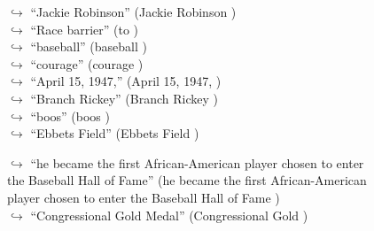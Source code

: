 \documentclass[11pt,a4paper, onecolumn]{article}
\begin{document}
\begin{figure}[t] \small \begin{tcolorbox}[boxsep=0pt,left=5pt,right=0pt,top=2pt,colback = yellow!5] \begin{dialogue}
 \small 
\colorbox{pink!25}{$\hookrightarrow$}
{ ``Jackie Robinson'' (Jackie Robinson ) }
\\
\colorbox{pink!25}{$\hookrightarrow$}
{ ``Race barrier'' (to ) }
\\
\colorbox{pink!25}{$\hookrightarrow$}
{ ``baseball'' (baseball ) }
\\
\colorbox{pink!25}{$\hookrightarrow$}
{ ``courage'' (courage ) }
\\
\colorbox{pink!25}{$\hookrightarrow$}
{ ``April 15, 1947,'' (April 15, 1947, ) }
\\
\colorbox{pink!25}{$\hookrightarrow$}
{ ``Branch Rickey'' (Branch Rickey ) }
\\
\colorbox{pink!25}{$\hookrightarrow$}
{ ``boos'' (boos ) }
\\
\colorbox{pink!25}{$\hookrightarrow$}
{ ``Ebbets Field'' (Ebbets Field ) }
 \end{dialogue}\end{tcolorbox}\end{figure}\begin{figure}[t] \small \begin{tcolorbox}[boxsep=0pt,left=5pt,right=0pt,top=2pt,colback = yellow!5] \begin{dialogue}
 \small 
\colorbox{pink!25}{$\hookrightarrow$}
{ ``he became the first African-American player chosen to enter the Baseball Hall of Fame'' (he became the first African-American player chosen to enter the Baseball Hall of Fame ) }
\\
\colorbox{pink!25}{$\hookrightarrow$}
{ ``Congressional Gold Medal'' (Congressional Gold ) }
\\

\end{dialogue}
\end{tcolorbox}
\end{figure}
\end{document}
